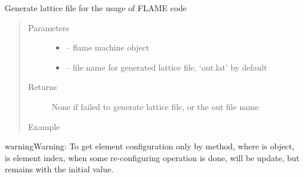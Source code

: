 \documentclass[letterpaper,10pt,english]{sphinxmanual}
\begin{document}
\begin{fulllineitems}
\label{\detokenize{src/apidocs/dakutils:genopt.dakutils.generate_latfile}}
Generate lattice file for the usage of FLAME code
\begin{quote}\begin{description}
\item[{Parameters}] \leavevmode\begin{itemize}
\item {} 
 -- flame machine object

\item {} 
 -- file name for generated lattice file, `out.lat' by default

\end{itemize}

\item[{Returns}] \leavevmode
None if failed to generate lattice file, or the out file name

\item[{Example}] \leavevmode
\end{description}\end{quote}

\begin{sphinxVerbatim}[commandchars=\\\{\},formatcom=\scriptsize]
   
  
  
   
  
   
\end{sphinxVerbatim}

\begin{sphinxadmonition}{warning}{Warning:}
To get element configuration only by  method,
where  is  object,  is element index,
when some re-configuring operation is done,  will be update,
but  remains with the initial value.
\end{sphinxadmonition}

\end{fulllineitems}
\end{document}
